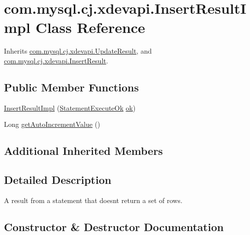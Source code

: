 \hypertarget{classcom_1_1mysql_1_1cj_1_1xdevapi_1_1_insert_result_impl}{}\section{com.\+mysql.\+cj.\+xdevapi.\+Insert\+Result\+Impl Class Reference}
\label{classcom_1_1mysql_1_1cj_1_1xdevapi_1_1_insert_result_impl}


Inherits \mbox{\hyperlink{classcom_1_1mysql_1_1cj_1_1xdevapi_1_1_update_result}{com.\+mysql.\+cj.\+xdevapi.\+Update\+Result}}, and \mbox{\hyperlink{interfacecom_1_1mysql_1_1cj_1_1xdevapi_1_1_insert_result}{com.\+mysql.\+cj.\+xdevapi.\+Insert\+Result}}.

\subsection*{Public Member Functions}
\begin{DoxyCompactItemize}
\item 
\mbox{\hyperlink{classcom_1_1mysql_1_1cj_1_1xdevapi_1_1_insert_result_impl_a67bd773b03aa9f9f06d57f6ce2b7d369}{Insert\+Result\+Impl}} (\mbox{\hyperlink{classcom_1_1mysql_1_1cj_1_1protocol_1_1x_1_1_statement_execute_ok}{Statement\+Execute\+Ok}} \mbox{\hyperlink{classcom_1_1mysql_1_1cj_1_1xdevapi_1_1_update_result_a9314dbffc186019112194b43a86e0174}{ok}})
\item 
Long \mbox{\hyperlink{classcom_1_1mysql_1_1cj_1_1xdevapi_1_1_insert_result_impl_a0849fb03ac4d7da386014ce3647e00ea}{get\+Auto\+Increment\+Value}} ()
\end{DoxyCompactItemize}
\subsection*{Additional Inherited Members}


\subsection{Detailed Description}
A result from a statement that doesn\textquotesingle{}t return a set of rows. 

\subsection{Constructor \& Destructor Documentation}
\mbox{\label{classcom_1_1mysql_1_1cj_1_1xdevapi_1_1_insert_result_impl_a67bd773b03aa9f9f06d57f6ce2b7d369}} 
